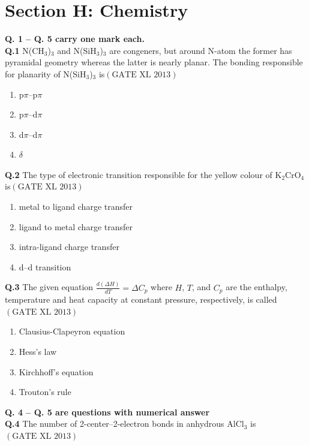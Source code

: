 \documentclass[12pt]{article}
\theoremstyle{remark}
\providecommand{\brak}[1]{\ensuremath{\left(#1\right)}}
\begin{document}
\clearpage\section*{Section H: Chemistry}
\noindent\textbf{Q. 1 – Q. 5 carry one mark each.}\\

\textbf{Q.1} N(CH$_3$)$_3$ and N(SiH$_3$)$_3$ are congeners, but around N-atom the former has pyramidal geometry whereas the latter is nearly planar. The bonding responsible for planarity of N(SiH$_3$)$_3$ is\hfill $\brak{\text{GATE XL 2013}}$
\begin{enumerate}
    \item p$\pi$–p$\pi$
    \item p$\pi$–d$\pi$
    \item d$\pi$–d$\pi$
    \item $\delta$
\end{enumerate}

\textbf{Q.2} The type of electronic transition responsible for the yellow colour of K$_2$CrO$_4$ is\hfill $\brak{\text{GATE XL 2013}}$
\begin{enumerate}
    \item metal to ligand charge transfer
    \item ligand to metal charge transfer
    \item intra-ligand charge transfer
    \item d–d transition
\end{enumerate}

\textbf{Q.3} The given equation $\frac{d\brak{\Delta H}}{dT} = \Delta C_p$ where $H$, $T$, and $C_p$ are the enthalpy, temperature and heat capacity at constant pressure, respectively, is called\hfill $\brak{\text{GATE XL 2013}}$
\begin{enumerate}
    \item Clausius-Clapeyron equation
    \item Hess’s law
    \item Kirchhoff’s equation
    \item Trouton’s rule
\end{enumerate}

\noindent\textbf{Q. 4 – Q. 5 are questions with numerical answer}\\

\textbf{Q.4} The number of 2-center–2-electron bonds in anhydrous AlCl$_3$ is \underline{\hspace{2cm}}\hfill $\brak{\text{GATE XL 2013}}$
\end{document}
